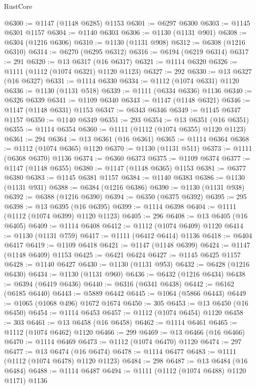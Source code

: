 \begin{lexlean}{RustCore}
\begin{coremodule}
@6300 := @1147 (@1148 @6285) @1153
@6301 := @6297 @6300
@6303 := @1145 @6301 @1157
@6304 := @1140 @6303
@6306 := @1130 (@1131 @901)
@6308 := @6304 (@1216 @6306)
@6310 := @1130 (@1131 @908)
@6312 := @6308 (@1216 @6310)
@6314 := @6270 (@6295 @6312)
@6316 := @6194 (@6219 @6314)
@6317 := 291
@6320 := @13 @6317 (@16 @6317)
@6321 := @1114 @6320
@6326 := @1111 (@1112 (@1074 @6321) @1120 @1123)
@6327 := 292
@6330 := @13 @6327 (@16 @6327)
@6331 := @1114 @6330
@6334 := @1112 (@1074 @6331) @1120
@6336 := @1130 (@1131 @518)
@6339 := @1111 (@6334 @6336) @1136
@6340 := @6326 @6339
@6341 := @1109 @6340
@6343 := @1147 (@1148 @6321)
@6346 := @1147 (@1148 @6331) @1153
@6347 := @6343 @6346
@6349 := @1145 @6347 @1157
@6350 := @1140 @6349
@6351 := 293
@6354 := @13 @6351 (@16 @6351)
@6355 := @1114 @6354
@6360 := @1111 (@1112 (@1074 @6355) @1120 @1123)
@6361 := 294
@6364 := @13 @6361 (@16 @6361)
@6365 := @1114 @6364
@6368 := @1112 (@1074 @6365) @1120
@6370 := @1130 (@1131 @511)
@6373 := @1111 (@6368 @6370) @1136
@6374 := @6360 @6373
@6375 := @1109 @6374
@6377 := @1147 (@1148 @6355)
@6380 := @1147 (@1148 @6365) @1153
@6381 := @6377 @6380
@6383 := @1145 @6381 @1157
@6384 := @1140 @6383
@6386 := @1130 (@1131 @931)
@6388 := @6384 (@1216 @6386)
@6390 := @1130 (@1131 @938)
@6392 := @6388 (@1216 @6390)
@6394 := @6350 (@6375 @6392)
@6395 := 295
@6398 := @13 @6395 (@16 @6395)
@6399 := @1114 @6398
@6404 := @1111 (@1112 (@1074 @6399) @1120 @1123)
@6405 := 296
@6408 := @13 @6405 (@16 @6405)
@6409 := @1114 @6408
@6412 := @1112 (@1074 @6409) @1120
@6414 := @1130 (@1131 @759)
@6417 := @1111 (@6412 @6414) @1136
@6418 := @6404 @6417
@6419 := @1109 @6418
@6421 := @1147 (@1148 @6399)
@6424 := @1147 (@1148 @6409) @1153
@6425 := @6421 @6424
@6427 := @1145 @6425 @1157
@6428 := @1140 @6427
@6430 := @1130 (@1131 @953)
@6432 := @6428 (@1216 @6430)
@6434 := @1130 (@1131 @960)
@6436 := @6432 (@1216 @6434)
@6438 := @6394 (@6419 @6436)
@6440 := @6316 (@6341 @6438)
@6442 := @6162 (@6185 @6440)
@6443 := @5889 @6442
@6445 := @1064 (@5866 @6443)
@6449 := @1065 (@1068 @496) @1672 @1674
@6450 := 305
@6453 := @13 @6450 (@16 @6450)
@6454 := @1114 @6453
@6457 := @1112 (@1074 @6454) @1120
@6458 := 303
@6461 := @13 @6458 (@16 @6458)
@6462 := @1114 @6461
@6465 := @1112 (@1074 @6462) @1120
@6466 := 299
@6469 := @13 @6466 (@16 @6466)
@6470 := @1114 @6469
@6473 := @1112 (@1074 @6470) @1120
@6474 := 297
@6477 := @13 @6474 (@16 @6474)
@6478 := @1114 @6477
@6483 := @1111 (@1112 (@1074 @6478) @1120 @1123)
@6484 := 298
@6487 := @13 @6484 (@16 @6484)
@6488 := @1114 @6487
@6494 := @1111 (@1112 (@1074 @6488) @1120 @1171) @1136

\end{coremodule}
\end{lexlean}
